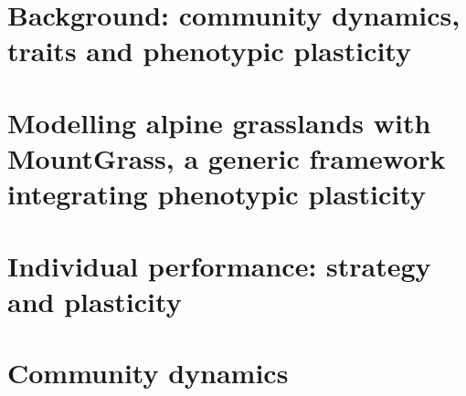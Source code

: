 \documentclass[a4paper, notoc, justified,marginals=left, nobib]{tufte-book}
\begin{document}
\part{Background: community dynamics, traits and phenotypic plasticity}\label{part:literature}
\begin{refsection}
\setcounter{chapter}{0}



\begin{fullwidth}
\printbibliography[heading=bibliography] 
\end{fullwidth}
\end{refsection}


\part{Modelling alpine grasslands with MountGrass, a generic framework integrating phenotypic plasticity}\label{part:model}
\setcounter{chapter}{0}
\begin{refsection}

%




\begin{fullwidth}
\printbibliography[heading=bibliography] 
\end{fullwidth}
\end{refsection}


\part{Individual performance: strategy and plasticity}\label{part:individuals}

\begin{refsection}
\setcounter{chapter}{0}


\begin{fullwidth}
\printbibliography[heading=bibliography] 
\end{fullwidth}
\end{refsection}

\part{Community dynamics}\label{part:community}
\end{document}
